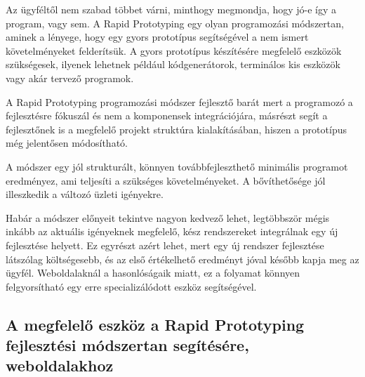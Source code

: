 \documentclass[a4paper,12pt,oneside]{report}
\begin{document}
\begin{justify}

	Az ügyféltől nem szabad többet várni, minthogy megmondja, hogy jó-e így a program, vagy sem. A Rapid Prototyping egy olyan programozási módszertan, aminek a lényege, hogy egy gyors prototípus segítségével a nem ismert követelményeket felderítsük. A gyors prototípus készítésére megfelelő eszközök szükségesek, ilyenek lehetnek például kódgenerátorok, terminálos kis eszközök vagy akár tervező programok. \cite{website:rapid_prototype}

	A Rapid Prototyping programozási módszer fejlesztő barát mert a programozó a fejlesztésre fókuszál és nem a komponensek integrációjára, másrészt segít a fejlesztőnek is a megfelelő projekt struktúra kialakításában, hiszen a prototípus még jelentősen módosítható.

	A módszer egy jól strukturált, könnyen továbbfejleszthető minimális programot eredményez, ami teljesíti a szükséges követelményeket. A bővíthetősége jól illeszkedik a változó üzleti igényekre. 

	Habár a módszer előnyeit tekintve nagyon kedvező lehet, legtöbbször mégis inkább az aktuális igényeknek megfelelő, kész rendszereket integrálnak egy új fejlesztése helyett. Ez egyrészt azért lehet, mert egy új rendszer fejlesztése látszólag költségesebb, és az első értékelhető eredményt jóval később kapja meg az ügyfél. Weboldalaknál a hasonlóságaik miatt, ez a folyamat könnyen felgyorsítható egy erre specializálódott eszköz segítségével.

\end{justify}

\newpage
\subsection{A megfelelő eszköz a Rapid Prototyping fejlesztési módszertan segítésére, weboldalakhoz }
\end{document}
